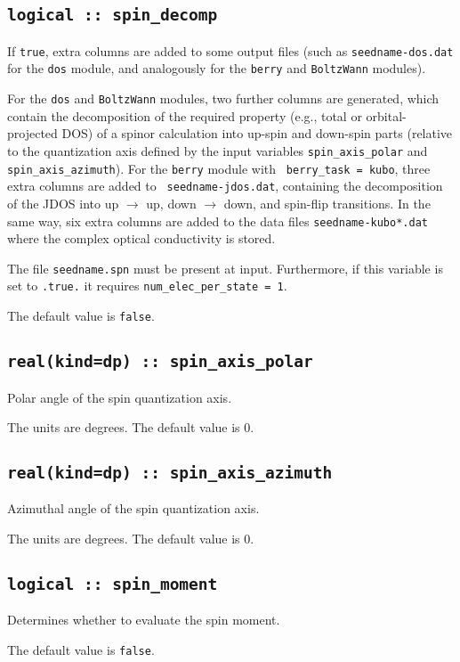 \subsection[spin\_decomp]{\tt logical :: spin\_decomp}
If {\tt true}, extra columns are added to some output files (such as
{\tt seedname-dos.dat} for the {\tt dos} module, and analogously for
the {\tt berry} and {\tt BoltzWann} modules).

For the {\tt dos} and {\tt BoltzWann} modules, two further columns are
generated, which contain the decomposition of the required property
(e.g., total or orbital-projected DOS) of a spinor calculation into
up-spin and down-spin parts (relative to the quantization axis defined
by the input variables {\tt spin\_axis\_polar} and {\tt
  spin\_axis\_azimuth}).  For the {\tt berry} module with {\tt
  berry\_task = kubo}, three extra columns are added to {\tt
  seedname-jdos.dat}, containing the decomposition of the JDOS into up
$\rightarrow$ up, down $\rightarrow$ down, and spin-flip
transitions. In the same way, six extra columns are added to the data
files {\tt seedname-kubo*.dat} where the complex optical conductivity
is stored.

The file {\tt seedname.spn} must be present at input. Furthermore, if
this variable is set to \verb#.true.# it
requires {\tt num\_elec\_per\_state = 1}.

The default value is \verb#false#.

  \subsection{\tt real(kind=dp) :: spin\_axis\_polar}
Polar angle of the spin quantization axis.

The units are degrees. The default value is 0.

\subsection{\tt real(kind=dp) :: spin\_axis\_azimuth}
Azimuthal angle of the spin quantization axis. 

The units are degrees. The default value is 0.

\subsection[spin\_moment]{\tt logical :: spin\_moment}
Determines whether to evaluate the spin moment.

The default value is \verb#false#.

